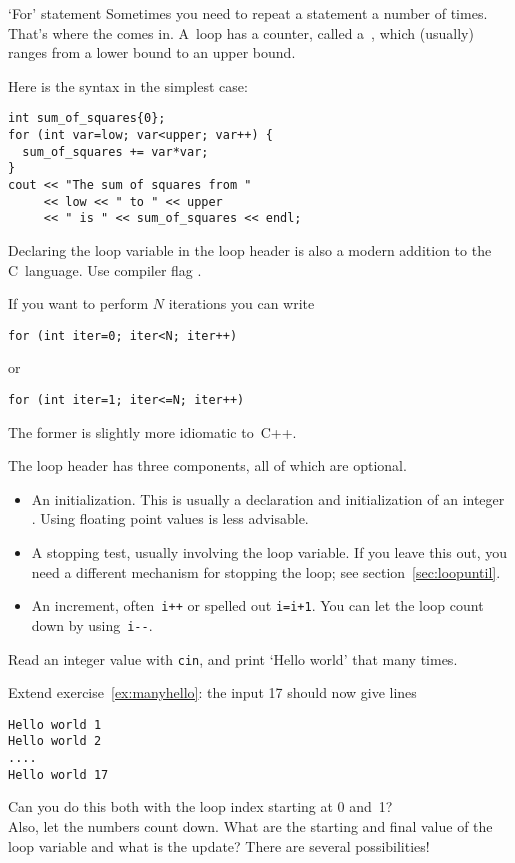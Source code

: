 \begin{slide}{`For' statement}
  \label{sl:for}
  Sometimes you need to repeat a statement a number of times. That's
  where the  comes in. A~loop has a counter, called
  a~, which (usually) ranges from a lower bound
  to an upper bound.

  Here is the syntax in the simplest case:
\begin{lstlisting}
int sum_of_squares{0};
for (int var=low; var<upper; var++) {
  sum_of_squares += var*var;
}
cout << "The sum of squares from "
     << low << " to " << upper
     << " is " << sum_of_squares << endl;
\end{lstlisting}
\end{slide}

\begin{remark}
  Declaring the loop variable in the loop header is also a modern
  addition to the C~language.
  Use compiler flag .
\end{remark}

If you want to perform $N$ iterations you can write
\begin{lstlisting}
for (int iter=0; iter<N; iter++)
\end{lstlisting}
or
\begin{lstlisting}
for (int iter=1; iter<=N; iter++)
\end{lstlisting}
The former is slightly more idiomatic to~C++.

The loop header has three components, all of which are optional.
\begin{itemize}
\item An initialization. This is usually a declaration and
  initialization of an integer . Using
  floating point values is less advisable.
\item A stopping test, usually
  involving the loop variable. If you leave this out, you need a
  different mechanism for stopping the loop; see section~\ref{sec:loopuntil}.
\item An increment, often~\lstinline{i++} or spelled out \lstinline{i=i+1}. You can let the loop count down by using~\lstinline{i--}.
\end{itemize}

\begin{exercise}
  \label{ex:manyhello}
  Read an integer value with \lstinline{cin}, and print `Hello world' that many times.
\end{exercise}
\begin{exercise}
  \label{ex:counthello}
  Extend exercise~\ref{ex:manyhello}: the input 17 should now give lines
\begin{verbatim}
Hello world 1
Hello world 2
....
Hello world 17
\end{verbatim}
Can you do this both with the loop index starting at 0 and~1?\\
Also, let the numbers count down. What are the starting and final
value of the loop variable and what is the update? There are several possibilities!
\end{exercise}

